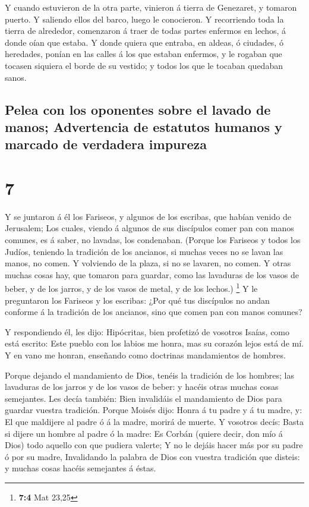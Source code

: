  Y cuando estuvieron de la otra parte, vinieron á tierra de
Genezaret, y tomaron puerto.  Y saliendo ellos del barco,
luego le conocieron.  Y recorriendo toda la tierra de
alrededor, comenzaron á traer de todas partes enfermos en lechos, á
donde oían que estaba.  Y donde quiera que entraba, en
aldeas, ó ciudades, ó heredades, ponían en las calles á los que estaban
enfermos, y le rogaban que tocasen siquiera el borde de su vestido; y
todos los que le tocaban quedaban sanos.

\hypertarget{pelea-con-los-oponentes-sobre-el-lavado-de-manos-advertencia-de-estatutos-humanos-y-marcado-de-verdadera-impureza}{%
\subsection{Pelea con los oponentes sobre el lavado de manos;
Advertencia de estatutos humanos y marcado de verdadera
impureza}\label{pelea-con-los-oponentes-sobre-el-lavado-de-manos-advertencia-de-estatutos-humanos-y-marcado-de-verdadera-impureza}}

\hypertarget{section-6}{%
\section{7}\label{section-6}}

 Y se juntaron á él los Fariseos, y algunos de los escribas,
que habían venido de Jerusalem;  Los cuales, viendo á
algunos de sus discípulos comer pan con manos comunes, es á saber, no
lavadas, los condenaban.  (Porque los Fariseos y todos los
Judíos, teniendo la tradición de los ancianos, si muchas veces no se
lavan las manos, no comen.  Y volviendo de la plaza, si no
se lavaren, no comen. Y otras muchas cosas hay, que tomaron para
guardar, como las lavaduras de los vasos de beber, y de los jarros, y de
los vasos de metal, y de los lechos.) \footnote{\textbf{7:4} Mat 23,25}
 Y le preguntaron los Fariseos y los escribas: ¿Por qué tus
discípulos no andan conforme á la tradición de los ancianos, sino que
comen pan con manos comunes?

 Y respondiendo él, les dijo: Hipócritas, bien profetizó de
vosotros Isaías, como está escrito: Este pueblo con los labios me honra,
mas su corazón lejos está de mí.  Y en vano me honran,
enseñando como doctrinas mandamientos de hombres.

 Porque dejando el mandamiento de Dios, tenéis la tradición
de los hombres; las lavaduras de los jarros y de los vasos de beber: y
hacéis otras muchas cosas semejantes.  Les decía también:
Bien invalidáis el mandamiento de Dios para guardar vuestra tradición.
 Porque Moisés dijo: Honra á tu padre y á tu madre, y: El
que maldijere al padre ó á la madre, morirá de muerte.  Y
vosotros decís: Basta si dijere un hombre al padre ó la madre: Es Corbán
(quiere decir, don mío á Dios) todo aquello con que pudiera valerte;
 Y no le dejáis hacer más por su padre ó por su madre,
 Invalidando la palabra de Dios con vuestra tradición que
disteis: y muchas cosas hacéis semejantes á éstas.

